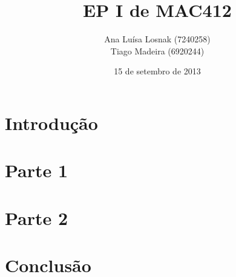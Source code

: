 \documentclass[a4paper,oneside,12pt]{article}
\title{EP I de MAC412}
\author{Ana Luísa Losnak (7240258)\\
        Tiago Madeira (6920244)}
\date{15 de setembro de 2013}
\begin{document}
\maketitle
\tableofcontents
\newpage

\section{Introdução}

\section{Parte 1}

\section{Parte 2}

\section{Conclusão}
\end{document}
